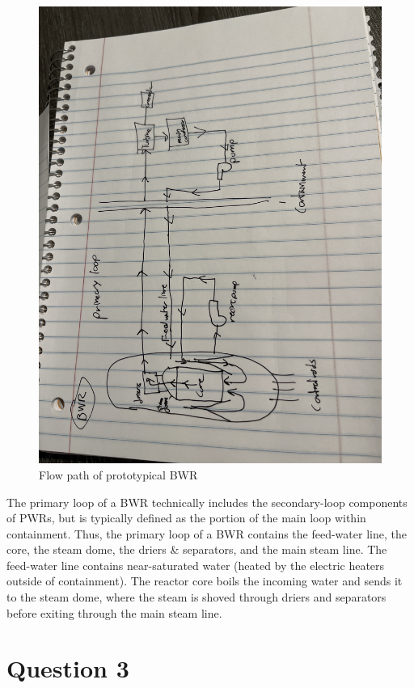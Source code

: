 \documentclass{article}
\begin{document}
\begin{figure}[!h!]
    \centering
    \includegraphics[width=0.9\linewidth,angle=180]{homeworks/HW3/hw3BWR.JPG}
    \caption{Flow path of prototypical BWR}
    \label{fig:bwr}
\end{figure}

\newpage
The primary loop of a BWR technically includes the secondary-loop components of PWRs, but is typically defined as the portion of the main loop within containment. Thus, the primary loop of a BWR contains the feed-water line, the core, the steam dome, the driers \& separators, and the main steam line. The feed-water line contains near-saturated water (heated by the electric heaters outside of containment). The reactor core boils the incoming water and sends it to the steam dome, where the steam is shoved through driers and separators before exiting through the main steam line. 


\newpage
\section*{Question 3}
\end{document}
